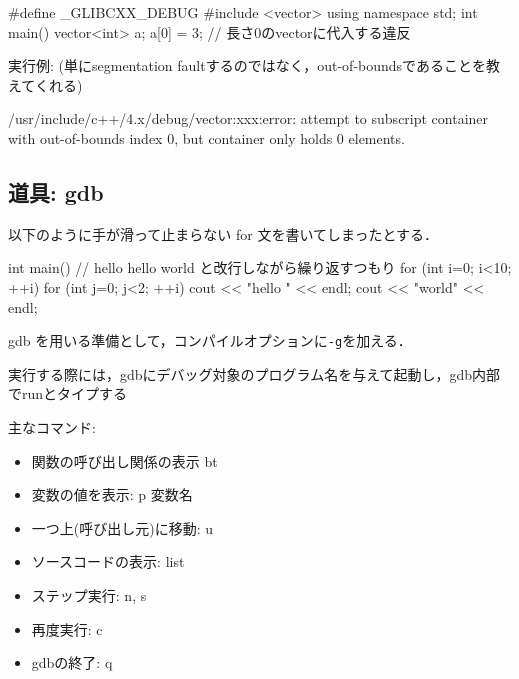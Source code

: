 \begin{cbox}[emph={_GLIBCXX_DEBUG}]
#define _GLIBCXX_DEBUG
#include <vector>
using namespace std;
int main() {
    vector<int> a;
    a[0] = 3; // 長さ0のvectorに代入する違反
}
\end{cbox}

実行例: (単にsegmentation faultするのではなく，out-of-boundsであることを教えてくれる)
\begin{terminal}
/usr/include/c++/4.x/debug/vector:xxx:error: attempt to subscript container 
    with out-of-bounds index 0, but container only holds 0 elements.
\end{terminal}

\subsection{道具: gdb}

以下のように手が滑って止まらない for 文を書いてしまったとする．
\begin{cbox}
int main() { // hello hello world と改行しながら繰り返すつもり
  for (int i=0; i<10; ++i) {
    for (int j=0; j<2; ++i)
      cout << "hello " << endl;
    cout << "world" << endl;
  }
}
\end{cbox}

gdb を用いる準備として，コンパイルオプションに\texttt{-g}を加える．

実行する際には，gdbにデバッグ対象のプログラム名を与えて起動し，gdb内部でrunとタイプする

主なコマンド:
\begin{itemize}
\setlength{\itemsep}{0pt}
\item 関数の呼び出し関係の表示 bt
\item 変数の値を表示: p 変数名
\item 一つ上(呼び出し元)に移動: u
\item ソースコードの表示: list
\item ステップ実行: n, s
\item 再度実行: c
\item gdbの終了: q
\end{itemize}

